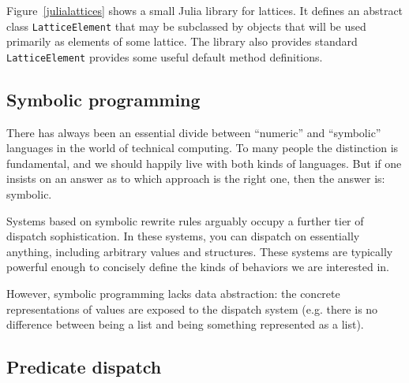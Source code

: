 Figure~\ref{julialattices} shows a small Julia library for lattices.
It defines an abstract class \texttt{LatticeElement} that may be subclassed
by objects that will be used primarily as elements of some lattice.
The library also provides standard
\texttt{LatticeElement} provides some useful default method definitions.



\subsection{Symbolic programming}

There has always been an essential divide between ``numeric'' and ``symbolic''
languages in the world of technical computing. To many people the
distinction is fundamental, and we should happily live with both
kinds of languages. But if one insists on an answer as to which approach
is the right one, then the answer is:   symbolic.

Systems based on symbolic rewrite rules arguably occupy a further tier of
dispatch sophistication. In these systems, you can dispatch on essentially
anything, including arbitrary values and structures. These systems are
typically powerful enough to concisely define the kinds of behaviors we
are interested in.

However, symbolic programming lacks data abstraction: the concrete
representations of values are exposed to the dispatch system
(e.g. there is no difference between being a list and being something
represented as a list).

\subsection{Predicate dispatch}


